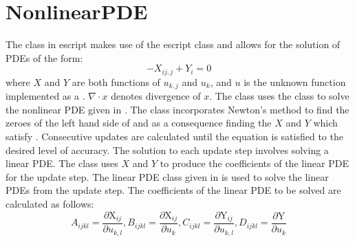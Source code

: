 \section{NonlinearPDE}
The \NLPDE class in escript makes use of the escript \SYMBOL class and allows
for the solution of PDEs of the form:
\begin{equation}
-X_{ij,j} + Y_i = 0
\label{symbolic eq1}
\end{equation}
where $X$ and $Y$ are both functions of $u_{k,j}$ and $u_k$, and $u$ is the
unknown function implemented as a \SYMBOL. $\nabla\cdotp x$ denotes divergence
of $x$.
The \NLPDE class uses the \SYMBOL class to solve the nonlinear PDE given in
.
The class incorporates Newton's method to find the zeroes of the left hand side
of  and as a consequence finding the $X$ and $Y$ which
satisfy . 
Consecutive updates are calculated until the equation is satisfied to the
desired level of accuracy. The solution to each update step involves solving a
linear PDE. The \NLPDE class uses $X$ and $Y$ to produce the coefficients of
the linear PDE for the update step. The linear PDE class given in
 is used to solve the linear PDEs from the update step.
The coefficients of the linear PDE to be solved are calculated as follows: 
\begin{equation*}
 A_{ijkl} = \frac{\partial \text{X}_{ij}}{\partial u_{k,l}}, B_{ijkl} = \frac{\partial \text{X}_{ij}}{\partial u_{k}}, C_{ijkl} = \frac{\partial \text{Y}_{ij}}{\partial u_{k,l}}, D_{ijkl} = \frac{\partial \text{Y}}{\partial u_{k}}
\end{equation*}
